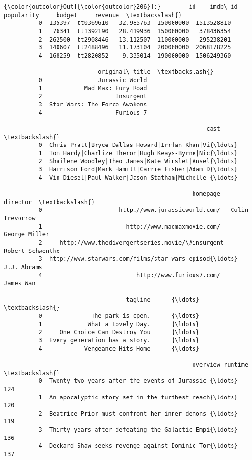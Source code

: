 \documentclass[11pt]{article}
\begin{document}
\begin{Verbatim}[commandchars=\\\{\}]
{\color{outcolor}Out[{\color{outcolor}206}]:}        id    imdb\_id  popularity     budget     revenue  \textbackslash{}
          0  135397  tt0369610   32.985763  150000000  1513528810   
          1   76341  tt1392190   28.419936  150000000   378436354   
          2  262500  tt2908446   13.112507  110000000   295238201   
          3  140607  tt2488496   11.173104  200000000  2068178225   
          4  168259  tt2820852    9.335014  190000000  1506249360   
          
                           original\_title  \textbackslash{}
          0                Jurassic World   
          1            Mad Max: Fury Road   
          2                     Insurgent   
          3  Star Wars: The Force Awakens   
          4                     Furious 7   
          
                                                          cast  \textbackslash{}
          0  Chris Pratt|Bryce Dallas Howard|Irrfan Khan|Vi{\ldots}   
          1  Tom Hardy|Charlize Theron|Hugh Keays-Byrne|Nic{\ldots}   
          2  Shailene Woodley|Theo James|Kate Winslet|Ansel{\ldots}   
          3  Harrison Ford|Mark Hamill|Carrie Fisher|Adam D{\ldots}   
          4  Vin Diesel|Paul Walker|Jason Statham|Michelle {\ldots}   
          
                                                      homepage          director  \textbackslash{}
          0                      http://www.jurassicworld.com/   Colin Trevorrow   
          1                        http://www.madmaxmovie.com/     George Miller   
          2     http://www.thedivergentseries.movie/\#insurgent  Robert Schwentke   
          3  http://www.starwars.com/films/star-wars-episod{\ldots}       J.J. Abrams   
          4                           http://www.furious7.com/         James Wan   
          
                                   tagline      {\ldots}       \textbackslash{}
          0              The park is open.      {\ldots}        
          1             What a Lovely Day.      {\ldots}        
          2     One Choice Can Destroy You      {\ldots}        
          3  Every generation has a story.      {\ldots}        
          4            Vengeance Hits Home      {\ldots}        
          
                                                      overview runtime  \textbackslash{}
          0  Twenty-two years after the events of Jurassic {\ldots}     124   
          1  An apocalyptic story set in the furthest reach{\ldots}     120   
          2  Beatrice Prior must confront her inner demons {\ldots}     119   
          3  Thirty years after defeating the Galactic Empi{\ldots}     136   
          4  Deckard Shaw seeks revenge against Dominic Tor{\ldots}     137   
          

\end{Verbatim}
\end{document}
